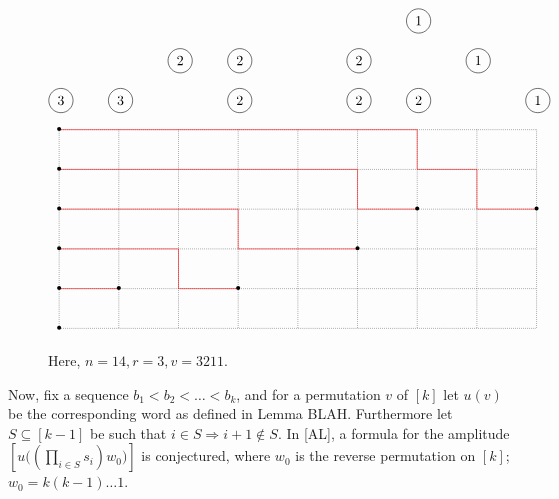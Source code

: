 \documentclass[submission]{FPSAC2018}
\newcommand{\0}{\phantom{c}}
\let\prodnonlimits\prod
\renewcommand{\prod}{\prodnonlimits\limits}
\theoremstyle{plain}
\theoremstyle{definition}
\numberwithin{equation}{section}
\begin{document}
\begin{figure}
\[
\begin{tikzpicture}[xscale=1.5]
  \node[circle,draw=black] at  (1, 0){3};
  \node[circle,draw=black] at  (2, 0){3};
  \node[circle,draw=black] at  (4, 0){2};
  \node[circle,draw=black] at  (6, 0){2};
  \node[circle,draw=black] at  (7, 0){2};
  \node[circle,draw=black] at  (9, 0){1};
  \node[circle,draw=black] at  (3, 1){2};
  \node[circle,draw=black] at  (4, 1){2};
  \node[circle,draw=black] at  (6, 1){2};
  \node[circle,draw=black] at  (8, 1){1};
  \node[circle,draw=black] at  (7, 2){1};
\end{tikzpicture}
\]
\[
\begin{tikzpicture}[xscale=1.5]
  \draw[densely dotted] (1, 1) -- (9, 1);
  \draw[densely dotted] (1, 2) -- (9, 2);
  \draw[densely dotted] (1, 3) -- (9, 3);
  \draw[densely dotted] (1, 4) -- (9, 4);
  \draw[densely dotted] (1, 5) -- (9, 5);
  \draw[densely dotted] (1, 6) -- (9, 6);

  \draw[densely dotted] (1, 6) -- (1, 1);
  \draw[densely dotted] (2, 6) -- (2, 1);
  \draw[densely dotted] (3, 6) -- (3, 1);
  \draw[densely dotted] (4, 6) -- (4, 1);
  \draw[densely dotted] (5, 6) -- (5, 1);
  \draw[densely dotted] (6, 6) -- (6, 1);
  \draw[densely dotted] (7, 6) -- (7, 1);
  \draw[densely dotted] (8, 6) -- (8, 1);
  \draw[densely dotted] (9, 6) -- (9, 1);

  \draw[draw=red] (1,2)--(2,2);
  \draw[draw=red] (1,3)--(3,3)--(3,2)--(4,2);
  \draw[draw=red] (1,4)--(4,4)--(4,3)--(6,3);
  \draw[draw=red] (1,5)--(6,5)--(6,4)--(7,4);
  \draw[draw=red] (1,6)--(7,6)--(7,5)--(8,5)--(8,4)--(9,4);

  \node at (1,1){\textbullet};
  \node at (1,2){\textbullet};
  \node at (1,3){\textbullet};
  \node at (1,4){\textbullet};
  \node at (1,5){\textbullet};
  \node at (1,6){\textbullet};
  \node at (2,2){\textbullet};
  \node at (4,2){\textbullet};
  \node at (6,3){\textbullet};
  \node at (7,4){\textbullet};
  \node at (9,4){\textbullet};
\end{tikzpicture}
\]
\caption{Here, $n = 14, r = 3, v = 3211$.}
\end{figure}

Now, fix a sequence $b_1 < b_2 < \dots < b_k$, and for a permutation $v$ of $[k]$ let $u(v)$ be the corresponding word as defined in Lemma BLAH. Furthermore let $S \subseteq [k-1]$ be such that $i\in S \Rightarrow i+1 \notin S$. In [AL], a formula for the amplitude $\left[ u\bigl( (\prod_{i\in S} s_i) w_0 \bigr) \right]$ is conjectured, where $w_0$ is the reverse permutation on $[k]$; $w_0 = k(k-1)\dots 1$.
\end{document}
